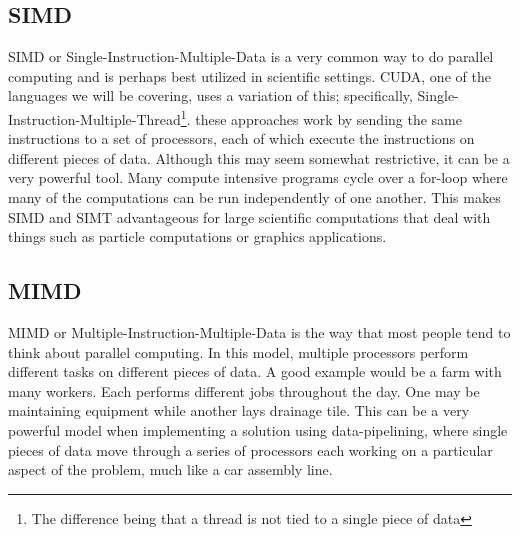 \documentclass{article}
\newcommand{\comp}[1]{{\ttfamily #1}}
\begin{document}
    \subsection{SIMD}
    SIMD or Single-Instruction-Multiple-Data is a very common way to do parallel computing and is perhaps best utilized in scientific settings. CUDA, one of the languages we will be covering, uses a variation of this; specifically, Single-Instruction-Multiple-Thread\footnote{The difference being that a thread is not tied to a single piece of data}. these approaches work by sending the same instructions to a set of processors, each of which execute the instructions on different pieces of data. Although this may seem somewhat restrictive, it can be a very powerful tool. Many compute intensive programs cycle over a \comp{for}-loop where many of the computations can be run independently of one another. This makes SIMD and SIMT advantageous for large scientific computations that deal with things such as particle computations or graphics applications.
    \subsection{MIMD}
    MIMD or Multiple-Instruction-Multiple-Data is the way that most people tend to think about parallel computing. In this model, multiple processors perform different tasks on different pieces of data. A good example would be a farm with many workers. Each performs different jobs throughout the day. One may be maintaining equipment while another lays drainage tile. This can be a very powerful model when implementing a solution using data-pipelining, where single pieces of data move through a series of processors each working on a particular aspect of the problem, much like a car assembly line.

\end{document}
